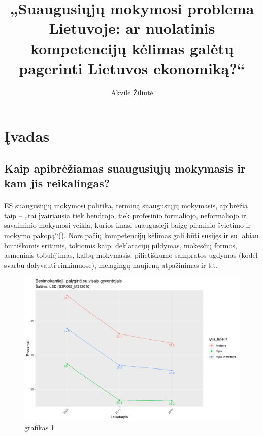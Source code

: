 \documentclass[12pt,a4paper, titlepage]{article}
\title{„Suaugusiųjų mokymosi problema Lietuvoje: ar nuolatinis kompetencijų kėlimas galėtų pagerinti Lietuvos ekonomiką?“}
\author{Akvilė Žiliūtė}
\begin{document}
\maketitle
\tableofcontents
\newpage

\section{Įvadas}
\subsection{Kaip apibrėžiamas suaugusiųjų mokymasis ir kam jis reikalingas?}
\paragraph{}
	ES suaugusiųjų mokymosi politika, terminą suaugusiųjų mokymasis, apibrėžia taip – „tai įvairiausia tiek bendrojo, tiek profesinio formaliojo, neformaliojo ir savaiminio mokymosi veikla, kurios imasi suaugusieji baigę pirminio švietimo ir mokymo pakopą“(\cite{bonjean_2019}). Nors pačių kompetencijų kėlimas gali būti susijęs ir su labiau buitiškomis sritimis, tokiomis kaip: deklaracijų pildymas, mokesčių formos, asmeninis tobulėjimas, kalbų mokymasis, pilietiškumo sampratos ugdymas (kodėl svarbu dalyvauti rinkimuose), melagingų naujienų atpažinimas ir t.t.
	
\begin{figure}[H]
\center
\includegraphics[scale=0.75]{Besimokantieji_palyginti_su_visais_gyventojais}
\caption{grafikas 1}
\end{figure}
\end{document}

